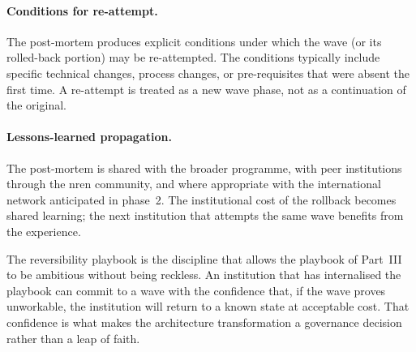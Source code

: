 \paragraph{Conditions for re-attempt.} The post-mortem produces
explicit conditions under which the wave (or its rolled-back
portion) may be re-attempted. The conditions typically include
specific technical changes, process changes, or pre-requisites that
were absent the first time. A re-attempt is treated as a new wave
phase, not as a continuation of the original.

\paragraph{Lessons-learned propagation.} The post-mortem is shared
with the broader programme, with peer institutions through the
\gls{nren} community, and where appropriate with the international
network anticipated in phase~2. The institutional cost of the
rollback becomes shared learning; the next institution that
attempts the same wave benefits from the experience.

\medskip

\noindent The reversibility playbook is the discipline that allows
the playbook of Part~III to be ambitious without being reckless.
An institution that has internalised the playbook can commit to a
wave with the confidence that, if the wave proves unworkable, the
institution will return to a known state at acceptable cost. That
confidence is what makes the architecture transformation a
governance decision rather than a leap of faith.
